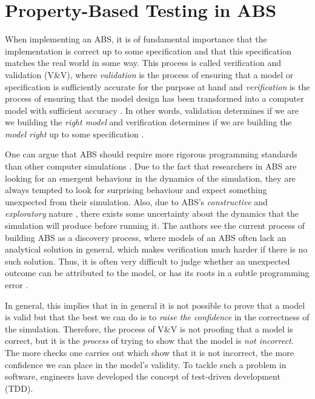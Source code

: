\chapter{Property-Based Testing in ABS}
\label{ch:property}

When implementing an ABS, it is of fundamental importance that the implementation is correct up to some specification and that this specification matches the real world in some way. This process is called verification and validation (V\&V), where \textit{validation} is the process of ensuring that a model or specification is sufficiently accurate for the purpose at hand and \textit{verification} is the process of ensuring that the model design has been transformed into a computer model with sufficient accuracy \cite{robinson_simulation:_2014}. In other words, validation determines if we are we building the \textit{right model} and verification determines if we are building the \textit{model right} up to some specification \cite{balci_verification_1998}.

One can argue that ABS should require more rigorous programming standards than other computer simulations \cite{polhill_ghost_2005}. Due to the fact that researchers in ABS are looking for an emergent behaviour in the dynamics of the simulation, they are always tempted to look for surprising behaviour and expect something unexpected from their simulation. 
Also, due to ABS's \textit{constructive} and \textit{exploratory} nature \cite{epstein_chapter_2006, epstein_generative_2012}, there exists some uncertainty about the dynamics that the simulation will produce before running it. The authors \cite{ormerod_validation_2006} see the current process of building ABS as a discovery process, where models of an ABS often lack an analytical solution in general, which makes verification much harder if there is no such solution. Thus, it is often very difficult to judge whether an unexpected outcome can be attributed to the model, or has its roots in a subtle programming error \cite{galan_errors_2009}.

In general, this implies that in in general it is not possible to prove that a model is valid but that the best we can do is to \textit{raise the confidence} in the correctness of the simulation. Therefore, the process of V\&V is not proofing that a model is correct, but it is the \textit{process} of trying to show that the model is \textit{not incorrect}. The more checks one carries out which show that it is not incorrect, the more confidence we can place in the model's validity. To tackle such a problem in software, engineers have developed the concept of test-driven development (TDD).

